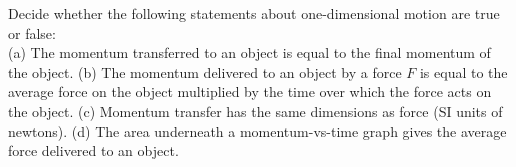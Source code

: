 Decide whether the following statements about
one-dimensional motion are true or false:\\
%
(a) The momentum transferred to an object is equal to the final momentum
of the object.\hwendpart
%
(b) The momentum delivered to an object by a force $F$ is equal to the
average force on the object multiplied by the time over which the
force acts on the object.\hwendpart
%
(c) Momentum transfer has the same dimensions as force (SI units of
newtons).\hwendpart
%
(d) The area underneath a momentum-vs-time graph gives the average
force delivered to an object.
